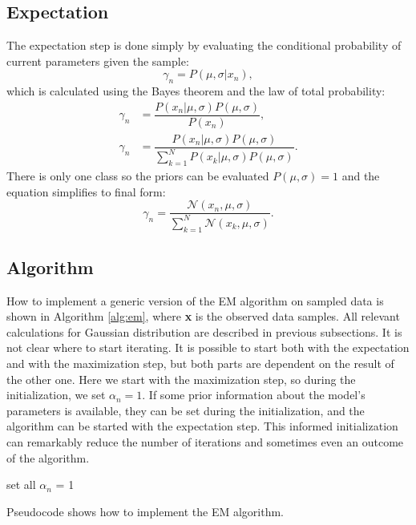 \subsection{Expectation}
The expectation step is done simply by evaluating the conditional probability of current parameters given the sample:
\begin{equation}
\gamma_n = P(\mu, \sigma | x_n),
\end{equation}
which is calculated using the Bayes theorem and the law of total probability:
\begin{align}
\gamma_n &= \dfrac{P(x_n | \mu, \sigma) P(\mu, \sigma)}{P(x_n)}, \nonumber \\
\gamma_n &= \dfrac{P(x_n | \mu, \sigma) P(\mu, \sigma)}{\sum_{k = 1}^N P(x_k | \mu, \sigma) P(\mu, \sigma)}.
\end{align}
There is only one class so the priors can be evaluated $P(\mu, \sigma) = 1$ and the equation simplifies to final form:
\begin{equation}
\gamma_n = \dfrac{\mathcal{N}(x_n, \mu, \sigma) }{\sum_{k = 1}^N \mathcal{N}(x_k, \mu, \sigma) }.
\end{equation}

\subsection{Algorithm}
How to implement a generic version of the EM algorithm on sampled data is shown in Algorithm \ref{alg:em}, where \textbf{x} is the observed data samples. All relevant calculations for Gaussian distribution are described in previous subsections. It is not clear where to start iterating. It is possible to start both with the expectation and with the maximization step, but both parts are dependent on the result of the other one. Here we start with the maximization step, so during the initialization, we set $\alpha_n = 1$. If some prior information about the model's parameters is available, they can be set during the initialization, and the algorithm can be started with the expectation step. This informed initialization can remarkably reduce the number of iterations and sometimes even an outcome of the algorithm.
\begin{algorithm}[]
 set all $\alpha_n$ = 1\;
 \caption{Pseudocode shows how to implement the EM algorithm.}
 \label{alg:em}
\end{algorithm}


